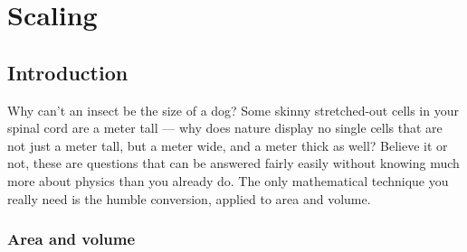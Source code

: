 \chapter{Scaling}
\label{ch:scaling}


\section{Introduction}\label{sec:intro-to-scaling}
\vspace{1.5mm}

Why can't an insect be the size of a dog? Some skinny
stretched-out cells in your spinal cord are a meter tall ---
why does nature display no single cells that are not just a
meter tall, but a meter wide, and a meter thick as well?
Believe it or not, these are questions that can be answered
fairly easily without knowing much more about physics than
you already do. The only mathematical technique you really
need is the humble conversion, applied to area and volume.



\subsection{Area and volume}

